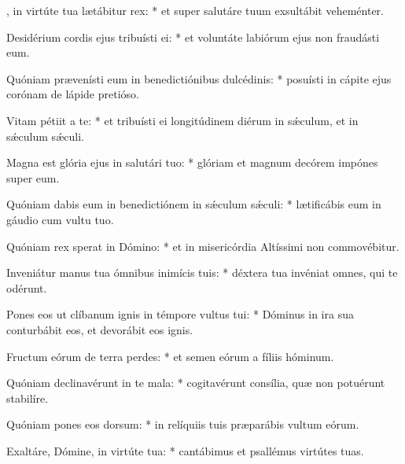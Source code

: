 \begin{psalmus}

    , in virtúte tua lætábitur rex: * et super salutáre tuum exsultábit veheménter.

    Desidérium cordis ejus tribuísti ei: * et voluntáte labiórum ejus non fraudásti eum.

    Quóniam prævenísti eum in benedictiónibus dulcédinis: * posuísti in cápite ejus corónam de lápide pretióso.

    Vitam pétiit a te: * et tribuísti ei longitúdinem diérum in sǽculum, et in sǽculum sǽculi.

    Magna est glória ejus in salutári tuo: * glóriam et magnum decórem impónes super eum.

    Quóniam dabis eum in benedictiónem in sǽculum sǽculi: * lætificábis eum in gáudio cum vultu tuo.

    Quóniam rex sperat in Dómino: * et in misericórdia Altíssimi non commovébitur.

    Inveniátur manus tua ómnibus inimícis tuis: * déxtera tua invéniat omnes, qui te odérunt.

    Pones eos ut clíbanum ignis in témpore vultus tui: * Dóminus in ira sua conturbábit eos, et devorábit eos ignis.

    Fructum eórum de terra perdes: * et semen eórum a fíliis hóminum.

    Quóniam declinavérunt in te mala: * cogitavérunt consília, quæ non potuérunt stabilíre.

    Quóniam pones eos dorsum: * in relíquiis tuis præparábis vultum eórum.

    Exaltáre, Dómine, in virtúte tua: * cantábimus et psallémus virtútes tuas.

\end{psalmus}
